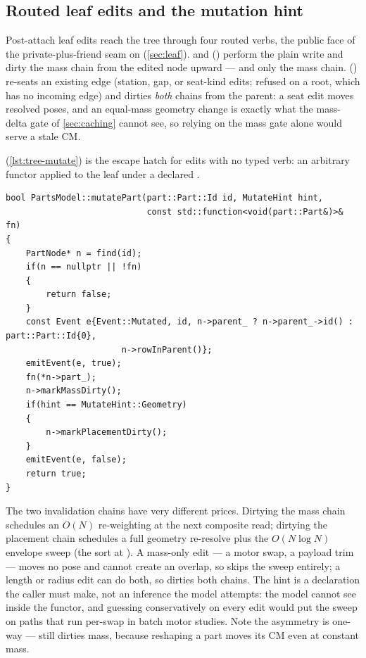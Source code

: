 \subsection{Routed leaf edits and the mutation hint}\label{sec:tree-edits}

Post-attach leaf edits reach the tree through four routed verbs, the public face of the
private-plus-friend seam on  (\cref{sec:leaf}).  and
 () perform the plain write and dirty the
mass chain from the edited node upward --- and only the mass chain. 
() re-seats an existing edge (station, gap, or seat-kind
edits; refused on a root, which has no incoming edge) and dirties \emph{both} chains from the
parent: a seat edit moves resolved poses, and an equal-mass geometry change is exactly what the
mass-delta gate of \cref{sec:caching} cannot see, so relying on the mass gate alone would serve a
stale CM.

 (\cref{lst:tree-mutate}) is the escape hatch for edits with no typed verb: an
arbitrary functor applied to the leaf under a declared .

\begin{listing}[htbp]
\begin{verbatim}
bool PartsModel::mutatePart(part::Part::Id id, MutateHint hint,
                            const std::function<void(part::Part&)>& fn)
{
    PartNode* n = find(id);
    if(n == nullptr || !fn)
    {
        return false;
    }
    const Event e{Event::Mutated, id, n->parent_ ? n->parent_->id() : part::Part::Id{0},
                       n->rowInParent()};
    emitEvent(e, true);
    fn(*n->part_);
    n->markMassDirty();
    if(hint == MutateHint::Geometry)
    {
        n->markPlacementDirty();
    }
    emitEvent(e, false);
    return true;
}
\end{verbatim}
\caption{The hinted escape hatch (--468): the write and its
invalidation are fused, and the hint chooses how much invalidation.}\label{lst:tree-mutate}
\end{listing}

\begin{designrule}
The two invalidation chains have very different prices. Dirtying the mass chain schedules an
$O(N)$ re-weighting at the next composite read; dirtying the placement chain schedules a full
geometry re-resolve plus the $O(N \log N)$ envelope sweep (the sort at
). A mass-only edit --- a motor swap, a payload trim ---
moves no pose and cannot create an overlap, so  skips the sweep entirely; a length
or radius edit can do both, so  dirties both chains. The hint is a declaration the
caller must make, not an inference the model attempts: the model cannot see inside the functor,
and guessing conservatively on every edit would put the sweep on paths that run per-swap in batch
motor studies. Note the asymmetry is one-way ---  still dirties mass, because
reshaping a part moves its CM even at constant mass.
\end{designrule}

